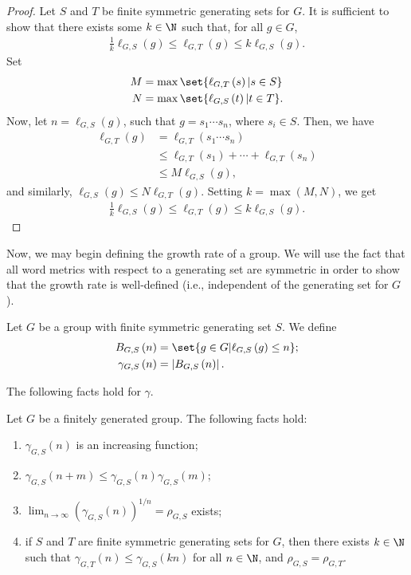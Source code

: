 \begin{proof}
  Let $S$ and $T$ be finite symmetric generating sets for $G$. It is sufficient to show that there exists some $k\in \N$ such that, for all $g\in G$,
  \begin{align*}
    \frac{1}{k}\ell_{G,S}\left(g\right) \leq \ell_{G,T}\left(g\right) \leq k\ell_{G,S}\left(g\right).
  \end{align*}
  Set
  \begin{align*}
    M &= \max\set{\ell_{G,T}\left(s\right) | s\in S}\\
    N &= \max\set{\ell_{G,S}\left(t\right) | t\in T}.
  \end{align*}
  Now, let $n = \ell_{G,S}\left(g\right)$, such that $g = s_1\cdots s_n$, where $s_i\in S$. Then, we have
  \begin{align*}
    \ell_{G,T}\left(g\right) &= \ell_{G,T}\left(s_1\cdots s_n\right)\\
                             &\leq \ell_{G,T}\left(s_1\right) + \cdots + \ell_{G,T}\left(s_n\right)\\
                             &\leq M\ell_{G,S}\left(g\right),
  \end{align*}
  and similarly, $\ell_{G,S}\left(g\right) \leq N\ell_{G,T}\left(g\right)$. Setting $k = \max\left(M,N\right)$, we get
  \begin{align*}
    \frac{1}{k}\ell_{G,S}\left(g\right) \leq \ell_{G,T}\left(g\right) \leq k\ell_{G,S}\left(g\right).
  \end{align*}
\end{proof}
Now, we may begin defining the growth rate of a group. We will use the fact that all word metrics with respect to a generating set are symmetric in order to show that the growth rate is well-defined (i.e., independent of the generating set for $G$).
\begin{definition}
  Let $G$ be a group with finite symmetric generating set $S$. We define
  \begin{align*}
    B_{G,S}\left(n\right) &= \set{g\in G | \ell_{G,S}\left(g\right) \leq n};\\
    \gamma_{G,S}\left(n\right) &= \left\vert B_{G,S}\left(n\right) \right\vert.
  \end{align*}
\end{definition}
The following facts hold for $\gamma$.
\begin{fact}\label{fact:properties_of_gamma_generating_set}
  Let $G$ be a finitely generated group. The following facts hold:
  \begin{enumerate}[(1)]
    \item $\gamma_{G,S}\left(n\right)$ is an increasing function;
    \item $\gamma_{G,S}\left(n+m\right)\leq \gamma_{G,S}\left(n\right)\gamma_{G,S}\left(m\right)$;
    \item $\displaystyle \lim_{n\rightarrow\infty}\left(\gamma_{G,S}\left(n\right)\right)^{1/n} = \rho_{G,S}$ exists;
    \item if $S$ and $T$ are finite symmetric generating sets for $G$, then there exists $k\in \N$ such that $\gamma_{G,T}\left(n\right)\leq \gamma_{G,S}\left(kn\right)$ for all $n\in\N$, and $\rho_{G,S} = \rho_{G,T}$.
  \end{enumerate}
\end{fact}
